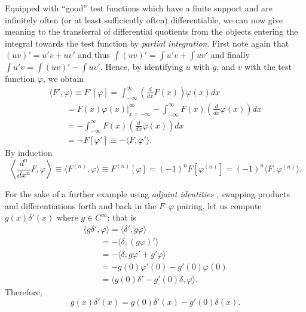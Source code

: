 Equipped with ``good'' test functions
which have a finite support and are
infinitely often (or at least sufficiently often) differentiable,
we can now give meaning to the transferral  of differential quotients from
the objects entering the integral towards the test function by {\em partial integration}.
First note again that $(uv)' = u'v+uv'$
and thus
$\int (uv)' = \int u'v+\int uv'$
and finally   $\int u'v = \int (uv)'  -\int uv'$.
Hence,     by identifying $u$ with $g$, and $v$ with the test function $\varphi$, we obtain
\begin{equation}
\begin{split}
\langle {F}' , \varphi \rangle \equiv {F}'\left[\varphi\right] =
\int_{-\infty}^\infty
\left( \frac{d}{dx} F(x)\right) \varphi (x) dx
\\
\qquad =
\left. F(x) \varphi (x) \right|_{x=-\infty}^\infty
- \int_{-\infty}^\infty
F(x)\left( \frac{d}{dx} \varphi (x) \right) dx \\
\qquad =
- \int_{-\infty}^\infty
F(x)\left( \frac{d}{dx} \varphi (x) \right) dx \\
\qquad =-F\left[\varphi  '\right] \equiv - \langle {F} , \varphi '\rangle .
\end{split}
\end{equation}
By induction
\begin{equation}
\left\langle \frac{d^{n}}{dx^{n}}{F} , \varphi \right\rangle
\equiv
\langle {F}^{(n)} , \varphi \rangle \equiv F^{(n)}\left[\varphi\right]
 = (-1)^n F\left[\varphi  ^{(n)}\right]
 = (-1)^n   \langle {F} , \varphi^{(n)}\rangle.
\end{equation}


{
\color{blue}
\bexample
For the sake of a further example using {\em adjoint identities}
,
swapping products and differentiations forth and back
in the $F$--$\varphi$ pairing, let us compute
$g(x)\delta' (x)$ where $g \in C^\infty$; that is
\begin{equation}
\begin{split}
\langle g \delta'   , \varphi \rangle
=
\langle \delta'   , g  \varphi \rangle
\\
\qquad =
- \langle \delta   , (g  \varphi )'\rangle
\\
\qquad =
- \langle \delta   ,  g  \varphi  '+ g'  \varphi  \rangle
\\
\qquad =
-  g(0)  \varphi ' (0) - g'(0)  \varphi(0)
\\
\qquad =
  \langle g(0) \delta '   -  g'(0)\delta , \varphi   \rangle
.
\end{split}
\end{equation}
\eexample
}
Therefore,
\begin{equation}
g(x)\delta' (x)=g(0) \delta '(x)   -  g'(0)\delta (x) .
\label{2012-m-ch-di-sederi}
\end{equation}




